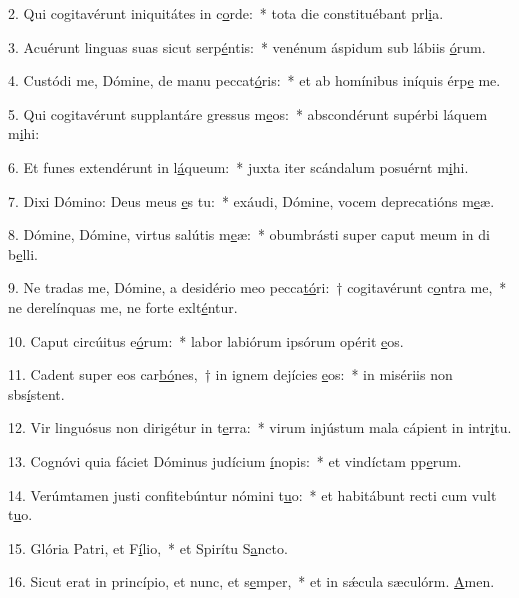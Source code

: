 2. Qui cogitavérunt iniquitátes in c\uline{o}rde:~* tota die constituébant prl\uline{i}a.\par 
3. Acuérunt linguas suas sicut serp\uline{é}ntis:~* venénum áspidum sub lábiis \uline{ó}rum.\par 
4. Custódi me, Dómine, de manu peccat\uline{ó}ris:~* et ab homínibus iníquis érp\uline{e} me.\par 
5. Qui cogitavérunt supplantáre gressus m\uline{e}os:~* abscondérunt supérbi láquem m\uline{i}hi:\par 
6. Et funes extendérunt in l\uline{á}queum:~* juxta iter scándalum posuérnt m\uline{i}hi.\par 
7. Dixi Dómino: Deus meus \uline{e}s tu:~* exáudi, Dómine, vocem deprecatións m\uline{e}æ.\par 
8. Dómine, Dómine, virtus salútis m\uline{e}æ:~* obumbrásti super caput meum in di b\uline{e}lli.\par 
9. Ne tradas me, Dómine, a desidério meo pecca\uline{tó}ri:~† cogitavérunt c\uline{o}ntra me,~* ne derelínquas me, ne forte exlt\uline{é}ntur.\par 
10. Caput circúitus e\uline{ó}rum:~* labor labiórum ipsórum opérit \uline{e}os.\par 
11. Cadent super eos car\uline{bó}nes,~† in ignem dejícies \uline{e}os:~* in misériis non sbs\uline{í}stent.\par 
12. Vir linguósus non dirigétur in t\uline{e}rra:~* virum injústum mala cápient in intr\uline{i}tu.\par 
13. Cognóvi quia fáciet Dóminus judícium \uline{í}nopis:~* et vindíctam pp\uline{e}rum.\par 
14. Verúmtamen justi confitebúntur nómini t\uline{u}o:~* et habitábunt recti cum vult t\uline{u}o.\par 
15. Glória Patri, et F\uline{í}lio,~* et Spirítu S\uline{a}ncto.\par 
16. Sicut erat in princípio, et nunc, et s\uline{e}mper,~* et in sǽcula sæculórm. \uline{A}men.\par 
